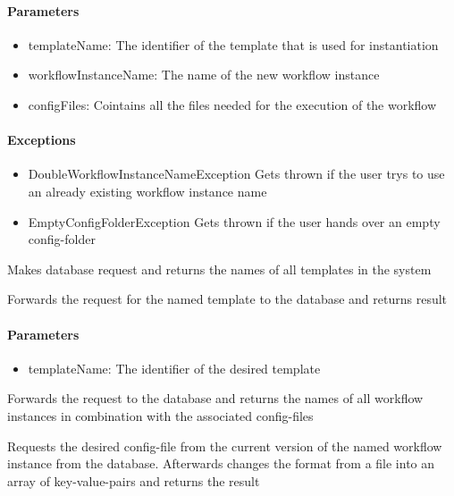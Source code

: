 \paragraph{Parameters}
\begin{itemize}
	\item{templateName:}
	The identifier of the template that is used for instantiation
	\item{workflowInstanceName:}
	The name of the new workflow instance
	\item{configFiles:}
	Cointains all the files needed for the execution of the workflow
\end{itemize}

\paragraph{Exceptions}
\begin{itemize}
	\item{DoubleWorkflowInstanceNameException}
	Gets thrown if the user trys to use an already existing workflow instance name
	\item{EmptyConfigFolderException}
	Gets thrown if the user hands over an empty config-folder
\end{itemize}

Makes database request and returns the names of all templates in the system

Forwards the request for the named template to the database and returns result

\paragraph{Parameters}
\begin{itemize}
	\item{templateName:}
	The identifier of the desired template
\end{itemize}

Forwards the request to the database and returns the names of all workflow instances in combination with the associated config-files

Requests the desired config-file from the current version of the named workflow instance from the database. Afterwards changes the format from a file into an array of key-value-pairs and returns the result

